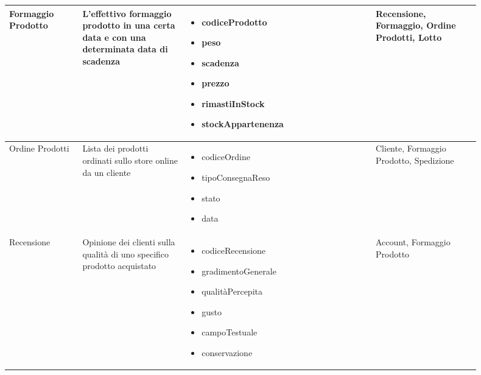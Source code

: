 \documentclass[12pt,a4paper]{article}
\begin{document}
\begin{center}
\begin{longtable}{|p{0.14\linewidth}|p{0.20\linewidth}|p{0.36\linewidth}|p{0.20\linewidth}|}
\hline
Formaggio Prodotto 	&  L'effettivo formaggio prodotto in una certa data e con una determinata data di scadenza  
					& \begin{itemize}
						\setlength{\itemindent}{-1em}
						\vspace{-25pt}
						\setlength\itemsep{-0.25em}
						\item codiceProdotto
						\item peso
						\item scadenza
						\item prezzo
						\item rimastiInStock
						\item stockAppartenenza
						
					\end{itemize}
					&  Recensione, Formaggio, Ordine Prodotti, Lotto  \\ 

\hline
Ordine Prodotti 		&  Lista dei prodotti ordinati sullo store online da un cliente  
					& \begin{itemize}
						\setlength{\itemindent}{-1em}
						\vspace{-25pt}
						\setlength\itemsep{-0.25em}
						\item codiceOrdine
						\item tipoConsegnaReso
						\item stato
						\item data
						
						
						
					\end{itemize}
					&  Cliente, Formaggio Prodotto, Spedizione  \\ 

\hline
Recensione 			&  Opinione dei clienti sulla qualità di uno specifico prodotto acquistato  
					& \begin{itemize}
						\setlength{\itemindent}{-1em}
						\vspace{-25pt}
						\setlength\itemsep{-0.25em}
						\item codiceRecensione
						\item gradimentoGenerale
						\item qualitàPercepita
						\item gusto
						\item campoTestuale
						\item conservazione
						
						
						
					\end{itemize}
					&  Account, Formaggio Prodotto  \\ 


\end{longtable}
\end{center}
\end{document}

